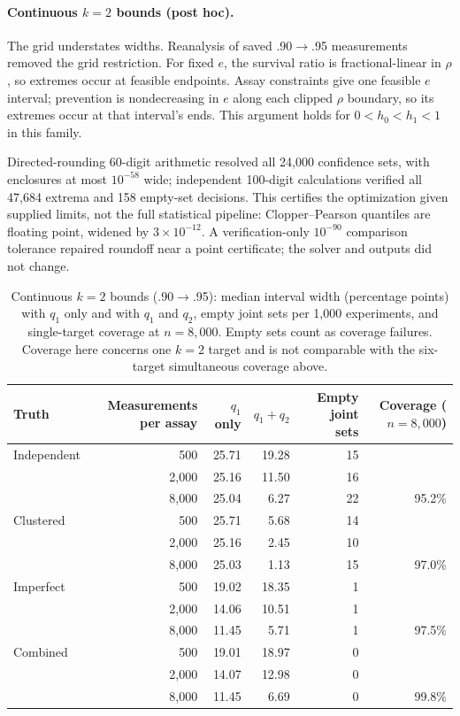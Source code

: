 \documentclass[11pt]{article}
\begin{document}
\paragraph{Continuous $k=2$ bounds (post hoc).} The grid understates widths.
Reanalysis of saved .90$\to$.95 measurements removed the grid restriction.
For fixed $e$, the survival ratio is fractional-linear in $\rho$, so extremes
occur at feasible endpoints. Assay constraints give one feasible $e$ interval;
prevention is nondecreasing in $e$ along each clipped $\rho$ boundary, so its
extremes occur at that interval's ends. This argument holds for
$0<h_0<h_1<1$ in this family.

Directed-rounding 60-digit arithmetic resolved all 24,000 confidence sets,
with enclosures at most $10^{-58}$ wide; independent 100-digit calculations
verified all 47,684 extrema and 158 empty-set decisions. This certifies the
optimization given supplied limits, not the full statistical pipeline:
Clopper--Pearson quantiles are floating point, widened by $3\times10^{-12}$.
A verification-only $10^{-90}$ comparison tolerance repaired roundoff near a
point certificate; the solver and outputs did not change.

\begin{table}[htbp]\centering\footnotesize
\caption{Continuous $k=2$ bounds (.90$\to$.95): median interval width (percentage points) with $q_1$ only and with $q_1$ and $q_2$, empty joint sets per 1,000 experiments, and single-target coverage at $n=8{,}000$. Empty sets count as coverage failures. Coverage here concerns one $k=2$ target and is not comparable with the six-target simultaneous coverage above.}\label{tab:uq-cont}
\begin{tabular}{lrrrrr}\toprule
Truth & Measurements per assay & $q_1$ only & $q_1+q_2$ & Empty joint sets & Coverage ($n=8{,}000$)\\\midrule
Independent & 500 & 25.71 & 19.28 & 15 & \\
 & 2,000 & 25.16 & 11.50 & 16 & \\
 & 8,000 & 25.04 & 6.27 & 22 & 95.2\%\\
Clustered & 500 & 25.71 & 5.68 & 14 & \\
 & 2,000 & 25.16 & 2.45 & 10 & \\
 & 8,000 & 25.03 & 1.13 & 15 & 97.0\%\\
Imperfect & 500 & 19.02 & 18.35 & 1 & \\
 & 2,000 & 14.06 & 10.51 & 1 & \\
 & 8,000 & 11.45 & 5.71 & 1 & 97.5\%\\
Combined & 500 & 19.01 & 18.97 & 0 & \\
 & 2,000 & 14.07 & 12.98 & 0 & \\
 & 8,000 & 11.45 & 6.69 & 0 & 99.8\%\\
\bottomrule\end{tabular}
\end{table}
\end{document}

